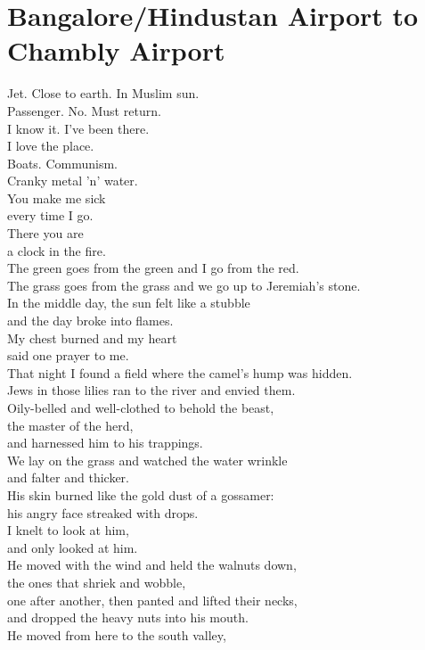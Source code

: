 \documentclass[smalldemyvopaper,11pt,twoside,onecolumn,openright,extrafontsizes]{memoir}
\newlength\drop
\begin{document}
\chapter{Bangalore/Hindustan Airport to Chambly Airport}
Jet. Close to earth. In Muslim sun.
\\Passenger. No. Must return.
\\I know it. I've been there.
\\I love the place.
\\Boats. Communism.
\\Cranky metal 'n' water.
\\You make me sick
\\every time I go.
\\There you are
\\a clock in the fire.
\\The green goes from the green and I go from the red.
\\The grass goes from the grass and we go up to Jeremiah's stone.
\\In the middle day, the sun felt like a stubble
\\and the day broke into flames.
\\My chest burned and my heart
\\said one prayer to me.
\\That night I found a field where the camel's hump was hidden.
\\Jews in those lilies ran to the river and envied them.
\\Oily-belled and well-clothed to behold the beast,
\\the master of the herd,
\\and harnessed him to his trappings.
\\We lay on the grass and watched the water wrinkle
\\and falter and thicker.
\\His skin burned like the gold dust of a gossamer:
\\his angry face streaked with drops.
\\I knelt to look at him,
\\and only looked at him.
\\He moved with the wind and held the walnuts down,
\\the ones that shriek and wobble,
\\one after another, then panted and lifted their necks,
\\and dropped the heavy nuts into his mouth.
\\He moved from here to the south valley,
\end{document}
